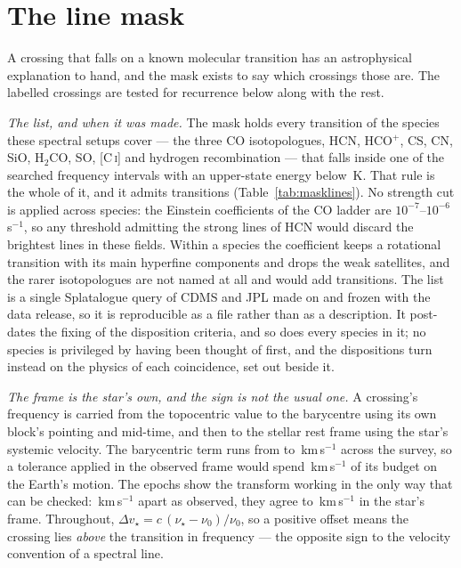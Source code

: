 \section{The line mask}
\label{app:linemask}

A crossing that falls on a known molecular transition has an astrophysical
explanation to hand, and the mask exists to say which crossings those are.
The labelled crossings are tested for recurrence below along with the rest.

\emph{The list, and when it was made.} The mask holds every transition of the
\FrNSpec{} species these spectral setups cover --- the three CO isotopologues,
HCN, HCO$^{+}$, CS, CN, SiO, H$_2$CO, SO, [C\,\textsc{i}] and hydrogen
recombination --- that falls inside one of the \McNIsland{} searched frequency
intervals with an upper-state energy below \McEuMax\,K. That rule is the whole
of it, and it admits \FrNTrans{} transitions
(Table~\ref{tab:masklines}). No strength cut is applied across species: the
Einstein coefficients of the CO ladder are $10^{-7}$--$10^{-6}$\,s$^{-1}$, so
any threshold admitting the strong lines of HCN would discard the brightest
lines in these fields. Within a species the coefficient keeps a rotational
transition with its main hyperfine components and drops the weak satellites,
and the rarer isotopologues are not named at all and would add \McNRare{}
transitions. The list is a single Splatalogue query of CDMS and JPL
\citep{Pickett1998,CDMS2005} made on \MkListDate{} and frozen with the data
release, so it is reproducible as a file rather than as a description. It
post-dates the \MkCritDate{} fixing of the disposition criteria, and so does
every species in it; no species is privileged by having been thought of
first, and the dispositions turn instead on the physics of each coincidence,
set out beside it.

\emph{The frame is the star's own, and the sign is not the usual one.} A
crossing's frequency is carried from the topocentric value to the barycentre
using its own block's pointing and mid-time, and then to the stellar rest
frame using the star's systemic velocity. The barycentric term runs from
\FrBaryLo{} to \FrBaryHi\,km\,s$^{-1}$ across the survey, so a tolerance
applied in the observed frame would spend \FrBarySwing\,km\,s$^{-1}$ of its
budget on the Earth's motion. The \FrEpochNEpoch{} \FrEpochStar{} epochs show
the transform working in the only way that can be checked:
\FrEpochTopoKms\,km\,s$^{-1}$ apart as observed, they agree to
\FrEpochStelKms\,km\,s$^{-1}$ in the star's frame. Throughout,
$\Delta v_\star = c\,(\nu_\star-\nu_0)/\nu_0$, so a positive offset means the
crossing lies \emph{above} the transition in frequency --- the opposite sign
to the velocity convention of a spectral line.

